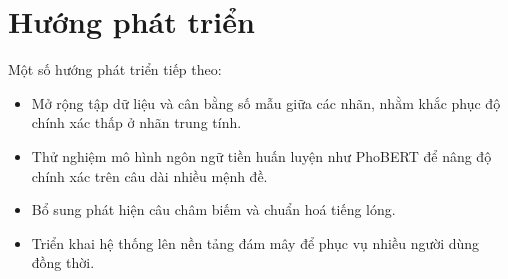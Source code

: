 \section{Hướng phát triển}

\begin{chuy}
\end{chuy}

\begin{mau}
Một số hướng phát triển tiếp theo:
\begin{itemize}[leftmargin=1.6em, itemsep=2pt]
  \item Mở rộng tập dữ liệu và cân bằng số mẫu giữa các nhãn, nhằm khắc phục
        độ chính xác thấp ở nhãn trung tính.
  \item Thử nghiệm mô hình ngôn ngữ tiền huấn luyện như PhoBERT để nâng độ
        chính xác trên câu dài nhiều mệnh đề.
  \item Bổ sung phát hiện câu châm biếm và chuẩn hoá tiếng lóng.
  \item Triển khai hệ thống lên nền tảng đám mây để phục vụ nhiều người dùng
        đồng thời.
\end{itemize}
\end{mau}
